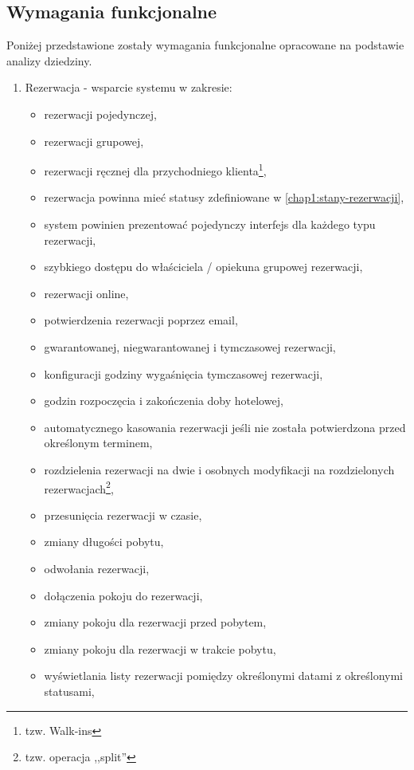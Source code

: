 \documentclass[a4paper,onecolumn,oneside,11pt,wide,floatssmall]{mwrep}
\theoremstyle{definition}
\theoremstyle{plain}%
\theoremstyle{remark}
\begin{document}
\subsection{Wymagania funkcjonalne}
\label{wymagania-funkcjonalne}
Poniżej przedstawione zostały wymagania funkcjonalne opracowane na podstawie analizy dziedziny.

\begin{enumerate}
  \item Rezerwacja - wsparcie systemu w zakresie:
    \begin{itemize}
      \item rezerwacji pojedynczej,
      \item rezerwacji grupowej,
      \item rezerwacji ręcznej dla przychodniego klienta\footnote{tzw. Walk-ins},
      \item rezerwacja powinna mieć statusy zdefiniowane w \ref{chap1:stany-rezerwacji},
      \item system powinien prezentować pojedynczy interfejs dla każdego typu rezerwacji,
      \item szybkiego dostępu do właściciela / opiekuna grupowej rezerwacji,
      \item rezerwacji online,
      \item potwierdzenia rezerwacji poprzez email,
      \item gwarantowanej, niegwarantowanej i tymczasowej rezerwacji,
      \item konfiguracji godziny wygaśnięcia tymczasowej rezerwacji,
      \item godzin rozpoczęcia i zakończenia doby hotelowej,
      \item automatycznego kasowania rezerwacji jeśli nie została potwierdzona przed określonym terminem,
      \item rozdzielenia rezerwacji na dwie i osobnych modyfikacji na rozdzielonych rezerwacjach\footnote{tzw. operacja ,,split''},
      \item przesunięcia rezerwacji w czasie,
      \item zmiany długości pobytu,
      \item odwołania rezerwacji,
      \item dołączenia pokoju do rezerwacji,
      \item zmiany pokoju dla rezerwacji przed pobytem,
      \item zmiany pokoju dla rezerwacji w trakcie pobytu,
      \item wyświetlania listy rezerwacji pomiędzy określonymi datami z określonymi statusami,

\end{itemize}
\end{enumerate}
\end{document}
